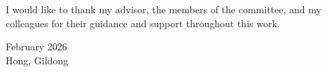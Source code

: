 
I would like to thank my advisor, the members of the committee, and my colleagues for their guidance and support throughout this work.

\begin{flushright}
    February 2026\\
    Hong, Gildong
\end{flushright}
